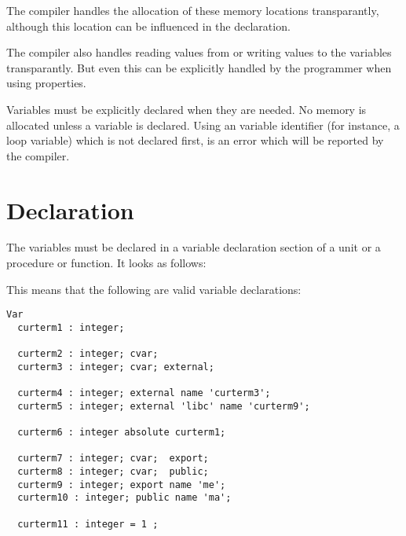 The \fpc compiler handles the allocation of these memory locations
transparantly, although this location can be influenced in the declaration.

The \fpc compiler also handles reading values from or writing values to
the variables transparantly. But even this can be explicitly handled by the
programmer when using properties.

Variables must be explicitly declared when they are needed. No memory is
allocated unless a variable is declared. Using an variable identifier (for
instance, a loop variable) which is not declared first, is an error which
will be reported by the compiler. 

\section{Declaration}
The variables must be declared in a variable declaration section of a unit
or a procedure or function. It looks as follows:


This means that the following are valid variable declarations:
\begin{verbatim}
Var
  curterm1 : integer;

  curterm2 : integer; cvar;
  curterm3 : integer; cvar; external;

  curterm4 : integer; external name 'curterm3';
  curterm5 : integer; external 'libc' name 'curterm9';

  curterm6 : integer absolute curterm1;

  curterm7 : integer; cvar;  export;
  curterm8 : integer; cvar;  public;
  curterm9 : integer; export name 'me';
  curterm10 : integer; public name 'ma';

  curterm11 : integer = 1 ;
\end{verbatim}

